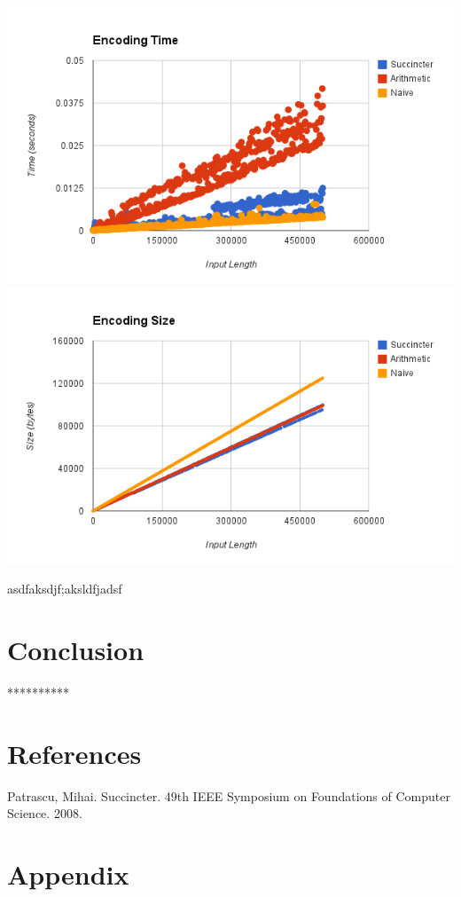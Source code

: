 \documentclass{article}
\begin{document}
\includegraphics[scale=0.4]{images/encoding_time}
\includegraphics[scale=0.4]{images/encoding_size}
\afterpage{\vfill}

asdfaksdjf;aksldfjadsf\\


\noindent \section{Conclusion}

\bigskip
\centerline{**********}

\noindent \section{References}
Patrascu, Mihai. Succincter. 49th IEEE Symposium on Foundations of Computer Science. 2008.

\noindent \section*{Appendix}

%

%

\end{document}

